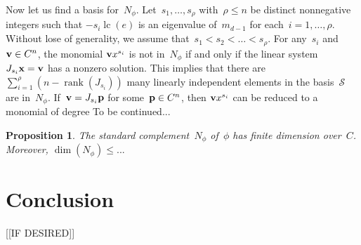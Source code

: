 \documentclass{sig-alternate}
\newtheorem{prop}[theorem]{Proposition}
\newcommand{\red}{\color{red}}
\newcommand{\cS}{ {\mathcal S}}
\newcommand{\vp} {{\bf p}}
\newcommand{\vv} {{\bf v}}
\newcommand{\vx} {{\bf x}}
\def\lc{\operatorname{lc}}
\def\rank{\operatorname{rank}}
\begin{document}
Now let us find a basis for~$N_\phi$. Let~$s_1, \ldots, s_\rho$ with~$\rho\leq n$ be distinct nonnegative integers such that
$-s_i\lc(e)$ is an eigenvalue of~$m_{d-1}$ for each~$i=1, \ldots, \rho$.
Without lose of generality,
we assume that~$s_1 <s_2<\ldots<s_\rho$. For any~$s_i$ and~$\vv\in C^n$, the monomial $\vv x^{s_i}$ is not in~$N_\phi$
if and only if the linear system~$J_{s_i}\vx = \vv$
has a nonzero solution. This implies that there are $\sum_{i=1}^\rho (n-\rank(J_{s_i}))$ many linearly
independent elements in the basis~$\cS$ are in~$N_\phi$. If~$\vv = J_{s_i} \vp$ for some~$\vp\in C^n$, then
$\vv x^{s_i}$ can be reduced to a monomial of degree {\red To be continued...}

\begin{prop}\label{prop:Nphi}
The standard complement~$N_\phi$ of~$\phi$ has finite dimension over~$C$. Moreover,
$\dim(N_\phi) \leq ...$
\end{prop}

\section{Conclusion}

[[IF DESIRED]]



\end{document}
